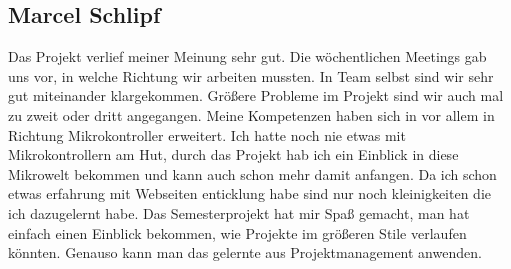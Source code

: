 \subsection*{Marcel Schlipf}
Das Projekt verlief meiner Meinung sehr gut. Die wöchentlichen Meetings gab uns
vor, in welche Richtung wir arbeiten mussten. In Team selbst sind wir sehr gut
miteinander klargekommen. Größere Probleme im Projekt sind wir auch mal zu zweit
oder dritt angegangen. \newline
Meine Kompetenzen haben sich in vor allem in Richtung Mikrokontroller erweitert.
Ich hatte noch nie etwas mit Mikrokontrollern am Hut, durch das Projekt hab ich
ein Einblick in diese Mikrowelt bekommen und kann auch schon mehr damit
anfangen.\newline
Da ich schon etwas erfahrung mit Webseiten enticklung habe sind nur noch
kleinigkeiten die ich dazugelernt habe.\newline
Das Semesterprojekt hat mir Spaß gemacht, man hat einfach einen Einblick
bekommen, wie Projekte im größeren Stile verlaufen könnten. Genauso kann man das
gelernte aus Projektmanagement anwenden.
